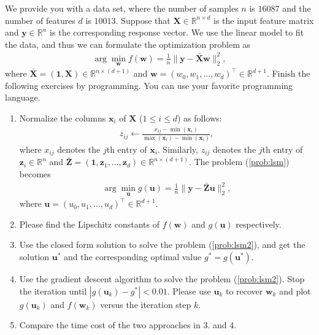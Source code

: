 \documentclass[11pt,letter,notitlepage]{article}
\begin{document}
\begin{exercise}
    We provide you with a data set, where the number of samples $n$ is $16087$ and the number of features $d$ is $10013$. Suppose that $\textbf{X}\in\mathbb{R}^{n\times d}$ is the input feature matrix and $\textbf{y}\in\mathbb{R}^n$ is the corresponding response vector. We use the linear model to fit the data, and thus we can formulate the optimization problem as 
    \begin{align}\label{prob:lsm}
        \arg\min_{\textbf{w}}f(\textbf{w}) = \frac{1}{n}\|\textbf{y}-\bar{\textbf{X}}\textbf{w}\|_2^2,
    \end{align}
    where $\bar{\textbf{X}}=(\textbf{1},\textbf{X})\in\mathbb{R}^{n\times(d+1)}$ and $\textbf{w}=(w_0,w_1,\dots,w_{d})^\top\in\mathbb{R}^{d+1}$.
    Finish the following exercises by programming. You can use your favorite programming language.
    \begin{enumerate}
        \item Normalize the columns $\textbf{x}_i$ of $\textbf{X}$ ($1\le i\le d$) as follows:
        \begin{align*}
            z_{ij}\leftarrow\frac{x_{ij}-\min (\textbf{x}_i)}{ \max (\textbf{x}_i) -  \min (\textbf{x}_i) },
        \end{align*}
        where $x_{ij}$ denotes the $j$th entry of $\textbf{x}_i$. Similarly, $z_{ij}$ denotes the $j$th entry of $\textbf{z}_i \in \mathbb{R}^n$ and $\bar{\textbf{Z}} = (\textbf{1},\textbf{z}_1,\dots,\textbf{z}_d)\in \mathbb{R}^{n\times(d+1)}$. The problem (\ref{prob:lsm}) becomes
        \begin{align}\label{prob:lsm2}
            \arg\min_{\textbf{u}}g(\textbf{u}) = \frac{1}{n}\|\textbf{y}-\bar{\textbf{Z}}\textbf{u}\|_2^2,
        \end{align}
        where $\textbf{u}=(u_0,u_1,\dots,u_{d})^\top\in\mathbb{R}^{d+1}$.
        \item Please find the Lipschitz constants of $f(\textbf{w})$ and $g(\textbf{u})$ respectively.
        \item Use the closed form solution to solve the problem (\ref{prob:lsm2}), and get the solution $\textbf{u}^*$ and the corresponding optimal value $g^* = g(\textbf{u}^*)$.
        \item Use the gradient descent algorithm to solve the problem (\ref{prob:lsm2}). Stop the iteration until $|g(\textbf{u}_k)-g^*|<0.01$. Please use $\textbf{u}_k$ to recover $\textbf{w}_k$ and plot $g(\textbf{u}_k)$ and $f(\textbf{w}_k)$ versus the iteration step $k$.
        \item Compare the time cost of the two approaches in 3. and 4.
    \end{enumerate}
\end{exercise}
\end{document}

